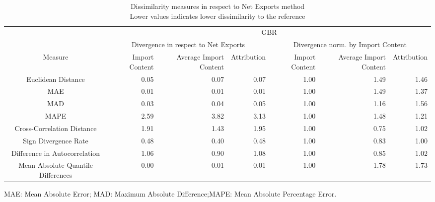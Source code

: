 \begin{table}[t]
\caption*{
{\large Dissimilarity measures in respect to Net Exports method} \\ 
{\small Lower values indicates lower dissimilarity to the reference}
} 
\fontsize{15.0pt}{18.0pt}\selectfont
\begin{tabular*}{\linewidth}{@{\extracolsep{\fill}}crrrrrr}
\toprule
 & \multicolumn{6}{c}{GBR} \\ 
\cmidrule(lr){2-7}
 & \multicolumn{3}{c}{Divergence in respect to Net Exports} & \multicolumn{3}{c}{Divergence norm. by Import Content} \\ 
\cmidrule(lr){2-4} \cmidrule(lr){5-7}
Measure & Import Content & Average Import Content & Attribution & Import Content & Average Import Content & Attribution \\ 
\midrule\addlinespace[2.5pt]
Euclidean Distance & 0.05 & 0.07 & 0.07 & 1.00 & 1.49 & 1.46 \\ 
MAE & 0.01 & 0.01 & 0.01 & 1.00 & 1.49 & 1.37 \\ 
MAD & 0.03 & 0.04 & 0.05 & 1.00 & 1.16 & 1.56 \\ 
MAPE & 2.59 & 3.82 & 3.13 & 1.00 & 1.48 & 1.21 \\ 
Cross-Correlation Distance & 1.91 & 1.43 & 1.95 & 1.00 & 0.75 & 1.02 \\ 
Sign Divergence Rate & 0.48 & 0.40 & 0.48 & 1.00 & 0.83 & 1.00 \\ 
Difference in Autocorrelation & 1.06 & 0.90 & 1.08 & 1.00 & 0.85 & 1.02 \\ 
Mean Absolute Quantile Differences & 0.00 & 0.01 & 0.01 & 1.00 & 1.78 & 1.73 \\ 
\bottomrule
\end{tabular*}
\begin{minipage}{\linewidth}
MAE: Mean Absolute Error; MAD: Maximum Absolute Difference;MAPE: Mean Absolute Percentage Error.\\
\end{minipage}
\end{table}


